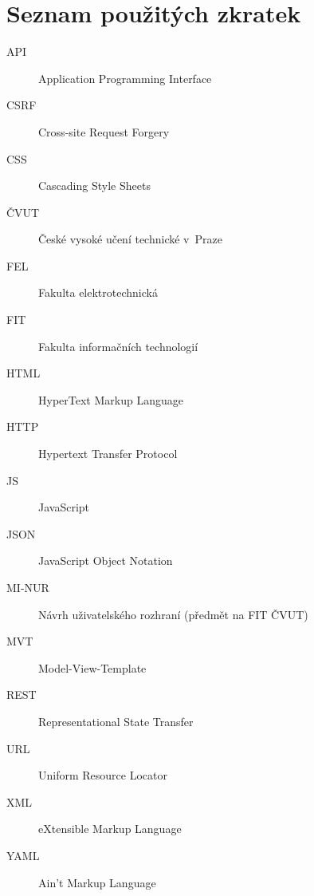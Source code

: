 \chapter{Seznam použitých zkratek}
\begin{description}
	\item[API] Application Programming Interface
	\item[CSRF] Cross-site Request Forgery
	\item[CSS] Cascading Style Sheets
	\item[ČVUT] České vysoké učení technické v~Praze
	\item[FEL] Fakulta elektrotechnická
	\item[FIT] Fakulta informačních technologií
	\item[HTML] HyperText Markup Language
	\item[HTTP] Hypertext Transfer Protocol
	\item[JS] JavaScript
	\item[JSON] JavaScript Object Notation
	\item[MI-NUR] Návrh uživatelského rozhraní (předmět na FIT ČVUT)
	\item[MVT] Model-View-Template
	\item[REST] Representational State Transfer
	\item[URL] Uniform Resource Locator
	\item[XML] eXtensible Markup Language
	\item[YAML] Ain't Markup Language
\end{description}